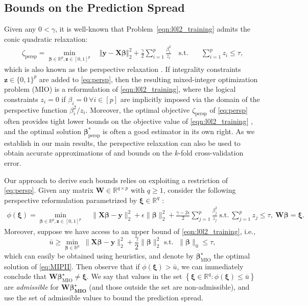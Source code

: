 \documentclass[ijoc,noblindrev]{informs3} %
\begin{document}
\subsection{Bounds on the Prediction Spread}\label{sec:predictionBound}

Given any $0< \gamma$, it is well-known that Problem~\eqref{eqn:l0l2_training} admits the conic quadratic relaxation:
\begin{align}\label{eq:persp}
\zeta_{\text{persp}}=\min_{\bm{\beta} \in \mathbb{R}^p,\bm{z}\in [0,1]^p} \quad  \Vert \bm{y}-\bm{X}\bm{\beta}\Vert_2^2 +\frac{\gamma}{2} \sum_{i=1}^p \frac{\beta_i^2}{z_i} \quad \text{s.t.} \quad &\sum_{i=1}^pz_i \leq \tau,
\end{align}
which is also known as the {perspective relaxation} \citep[][]{ceria1999convex, xie2020scalable}.
If integrality constraints $\bm{z}\in \{0,1\}^p$ are added to \eqref{eq:persp}, then the resulting mixed-integer optimization problem (MIO) is a reformulation of \eqref{eqn:l0l2_training}, where the logical constraints $z_i=0$ if $\beta_i= 0 \ \forall i \in [p]$ are implicitly imposed via the domain of the perspective function $\beta_i^2/z_i$. Moreover, the optimal objective $\zeta_{\text{persp}}$ of \eqref{eq:persp} often provides tight lower bounds on the objective value of \eqref{eqn:l0l2_training} \citep[]{pilanci2015sparse,bertsimas2020sparse, askari2022approximation}, and the optimal solution $\bm{\beta}_{\text{persp}}^*$ is often a good estimator in its own right. As we establish in our main results, the perspective relaxation can also be used to obtain accurate approximations of and bounds on the $k$-fold cross-validation error.

\iffalse Our approach to derive such bounds relies on exploiting a restriction of \eqref{eq:persp}. Given any matrix $\bm{W}\in \mathbb{R}^{q\times p}$ with $q\geq 1$, consider the following perspective reformulation parametrized by $\bm{\xi}\in \mathbb{R}^q$ :
\begin{align}\label{eq:perspRestricted}
	\phi(\bm{\xi})=\min_{\bm{\beta}\in \mathbb{R}^p,\bm{z}\in [0,1]^p}\;& \|\bm{X}\bm{\beta}-\bm{y}\|_2^2+\epsilon\|\bm{\beta}\|_2^2+\frac{\gamma-2\epsilon}{2}\sum_{j=1}^p \frac{\beta_j^2}{z_j}\ \text{s.t.}\ \sum_{j=1}^p z_j\leq \tau,\ \bm{W\beta}=\bm{\xi}.
\end{align}
Moreover, suppose we have access to an upper bound of \eqref{eqn:l0l2_training}, i.e., 
\begin{equation}\label{eq:MIPII}
		\bar u\geq \min_{\bm{\beta}\in \mathbb{R}^p}\; \|\bm{X}\bm{\beta}-\bm{y}\|_2^2+\frac{\gamma}{2}\|\bm{\beta}\|_2^2
		\text{ s.t. }\; \|\bm{\beta}\|_0\leq \tau,
	\end{equation} 
 which can easily be obtained using heuristics, and denote by $\bm{\beta}^\star_{\text{MIO}}$ the optimal solution of \eqref{eq:MIPII}. Then observe that if $\phi(\bm{\xi})>\bar u$, we can immediately conclude that $\bm{W}\bm{\beta}^\star_{\text{MIO}}\neq \bm{\xi}$. We say that values in the set $\left\{\bm{\xi}\in \mathbb{R}^q:\phi(\bm{\xi})\leq \bar u\right\}$ are \emph{admissible} for $\bm{W\bm{\beta}^\star_{\text{MIO}}}$ (and those outside the set are non-admissible), and use the set of admissible values to bound the prediction spread. 
 
\end{document}
